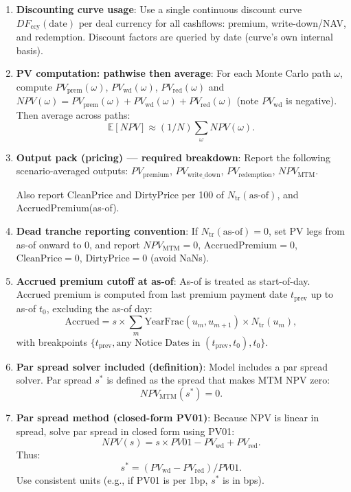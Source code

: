 \documentclass[11pt]{article}
\begin{document}
\begin{enumerate}[label=\arabic*),leftmargin=*,align=left]
Within the replenishment period, prepayment-driven reductions are eligible for top-off (treated like amortization/maturity). Defaults are not eligible for top-off.

\item \textbf{Discounting curve usage}: Use a single continuous discount curve $DF_{\text{ccy}}(\text{date})$ per deal currency for all cashflows: premium, write-down/NAV, and redemption. Discount factors are queried by date (curve’s own internal basis).

\item \textbf{PV computation: pathwise then average}: For each Monte Carlo path $\omega$, compute $PV_{\text{prem}}(\omega)$, $PV_{\text{wd}}(\omega)$, $PV_{\text{red}}(\omega)$ and $NPV(\omega) = PV_{\text{prem}}(\omega) + PV_{\text{wd}}(\omega) + PV_{\text{red}}(\omega)$ (note $PV_{\text{wd}}$ is negative). Then average across paths:
\[ \mathbb{E}[NPV] \approx (1/N) \sum_\omega NPV(\omega). \]

\item \textbf{Output pack (pricing) — required breakdown}: Report the following scenario-averaged outputs:
$PV_{\text{premium}}$, $PV_{\text{write\_down}}$, $PV_{\text{redemption}}$, $NPV_{\text{MTM}}$.

Also report CleanPrice and DirtyPrice per 100 of $N_{\text{tr}}(\text{as-of})$, and AccruedPremium(as-of).

\item \textbf{Dead tranche reporting convention}: If $N_{\text{tr}}(\text{as-of}) = 0$, set PV legs from as-of onward to 0, and report $NPV_{\text{MTM}} = 0$, $\text{AccruedPremium} = 0$, $\text{CleanPrice} = 0$, $\text{DirtyPrice} = 0$ (avoid NaNs).

\item \textbf{Accrued premium cutoff at as-of}: As-of is treated as start-of-day. Accrued premium is computed from last premium payment date $t_{\text{prev}}$ up to as-of $t_0$, excluding the as-of day:
\[ \text{Accrued} = s \times \sum_m \text{YearFrac}(u_m, u_{m+1}) \times N_{\text{tr}}(u_m), \]
with breakpoints $\{t_{\text{prev}}, \text{any Notice Dates in } (t_{\text{prev}}, t_0), t_0\}$.

\item \textbf{Par spread solver included (definition)}: Model includes a par spread solver. Par spread $s^*$ is defined as the spread that makes MTM NPV zero:
\[ NPV_{\text{MTM}}(s^*) = 0. \]

\item \textbf{Par spread method (closed-form PV01)}: Because NPV is linear in spread, solve par spread in closed form using PV01:
\[ NPV(s) = s \times PV01 - PV_{\text{wd}} + PV_{\text{red}}. \]
Thus:
\[ s^* = (PV_{\text{wd}} - PV_{\text{red}}) / PV01. \]
Use consistent units (e.g., if PV01 is per 1bp, $s^*$ is in bps).


\end{enumerate}
\end{document}
